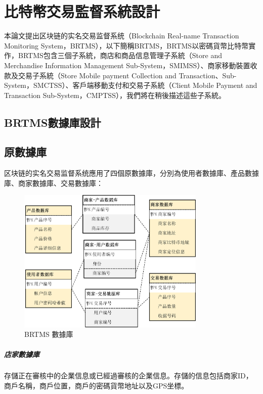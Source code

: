 
\chapter{比特幣交易監督系統設計}
本論文提出区块链的实名交易监督系统（Blockchain Real-name Transaction Monitoring System，BRTMS），以下簡稱BRTMS，BRTMS以密碼貨幣比特幣實作，BRTMS包含三個子系統，商店和商品信息管理子系統（Store and Merchandise Information Management Sub-System，SMIMSS）、商家移動裝置收款及交易子系統（Store Mobile payment Collection and Transaction、Sub-System，SMCTSS）、客戶端移動支付和交易子系統（Client Mobile Payment and Transaction Sub-System，CMPTSS），我們將在稍後描述這些子系統。

	\section{BRTMS數據庫設計}
		\section{原數據庫}
		区块链的实名交易监督系统應用了四個原數據庫，分別為使用者數據庫、產品數據庫、商家數據庫、交易數據庫：
		\begin{figure}[h]
			\centering
			\includegraphics[width = 0.8\textwidth]{db.png}
			\caption{BRTMS 數據庫}\label{db}
		\end{figure}

			\paragraph{店家數據庫}存儲正在審核中的企業信息或已經過審核的企業信息。存儲的信息包括商家ID，商戶名稱，商戶位置，商戶的密碼貨幣地址以及GPS坐標。
